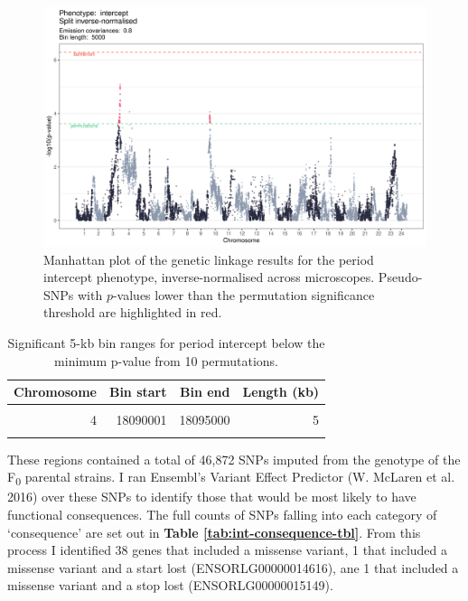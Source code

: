 \documentclass[
]{book}
\begin{document}
\begin{figure}
\includegraphics[width=1\linewidth]{figs/somites/manhattan_intercept} \caption{Manhattan plot of the genetic linkage results for the period intercept phenotype, inverse-normalised across microscopes. Pseudo-SNPs with \(p\)-values lower than the permutation significance threshold are highlighted in red.}\label{fig:somite-manhattan}
\end{figure}

\begin{table}

\caption{\label{tab:somite-sig-int-tbl}Significant 5-kb bin ranges for period intercept below the minimum p-value from 10 permutations.}
\centering
\begin{tabular}[t]{rrrr}
\toprule
Chromosome & Bin start & Bin end & Length (kb)\\
\midrule
\cellcolor{gray!6}{3} & \cellcolor{gray!6}{31880001} & \cellcolor{gray!6}{35420000} & \cellcolor{gray!6}{3540}\\
4 & 18090001 & 18095000 & 5\\
\cellcolor{gray!6}{10} & \cellcolor{gray!6}{2995001} & \cellcolor{gray!6}{3690000} & \cellcolor{gray!6}{695}\\
\bottomrule
\end{tabular}
\end{table}

These regions contained a total of 46,872 SNPs imputed from the genotype of the F\textsubscript{0} parental strains.
I ran Ensembl's Variant Effect Predictor (W. McLaren et al. 2016) over these SNPs to identify those that would be most likely to have functional consequences. The full counts of SNPs falling into each category of `consequence' are set out in \textbf{Table \ref{tab:int-consequence-tbl}}. From this process I identified 38 genes that included a missense variant, 1 that included a missense variant and a start lost (ENSORLG00000014616), ane 1 that included a missense variant and a stop lost (ENSORLG00000015149).
\end{document}
